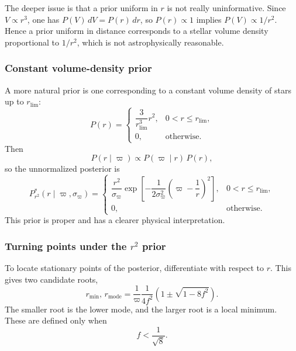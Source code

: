 \documentclass[11pt, titlepage]{article} %
\numberwithin{equation}{section}
\theoremstyle{definition}
\numberwithin{assumption}{section}
\begin{document}
The deeper issue is that a prior uniform in $r$ is not really uninformative. Since $V\propto r^3$, one has $P(V)\,dV=P(r)\,dr$, so $P(r)\propto 1$ implies $P(V)\propto 1/r^2$. Hence a prior uniform in distance corresponds to a stellar volume density proportional to $1/r^2$, which is not astrophysically reasonable.

\subsubsection*{Constant volume-density prior}

A more natural prior is one corresponding to a constant volume density of stars up to $r_{\mathrm{lim}}$:
\begin{equation*}
    P(r)=
    \begin{cases}
        \dfrac{3}{r_{\mathrm{lim}}^3}r^2, & 0<r\le r_{\mathrm{lim}},\\
        0, & \text{otherwise}.
    \end{cases}
\end{equation*}
Then
\begin{equation*}
    P(r\mid \varpi)\propto P(\varpi\mid r)\,P(r),
\end{equation*}
so the unnormalized posterior is
\begin{equation*}
    P_{r^2}^*(r\mid \varpi,\sigma_\varpi)=
    \begin{cases}
        \dfrac{r^2}{\sigma_\varpi}
        \exp\!\left[
        -\dfrac{1}{2\sigma_\varpi^2}
        \left(\varpi-\dfrac{1}{r}\right)^2
        \right], & 0<r\le r_{\mathrm{lim}},\\
        0, & \text{otherwise}.
    \end{cases}
\end{equation*}
This prior is proper and has a clearer physical interpretation.

\subsubsection*{Turning points under the $r^2$ prior}

To locate stationary points of the posterior, differentiate with respect to $r$. This gives two candidate roots,
\begin{equation*}
    r_{\min},\,r_{\mathrm{mode}}
    =
    \frac{1}{\varpi}\frac{1}{4f^2}
    \left(1\pm \sqrt{1-8f^2}\right).
\end{equation*}
The smaller root is the lower mode, and the larger root is a local minimum. These are defined only when
\begin{equation*}
    f<\frac{1}{\sqrt{8}}.
\end{equation*}
\end{document}
